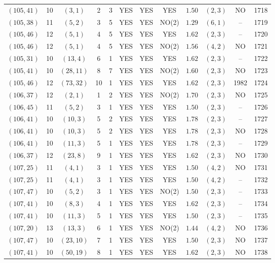 \begin{longtable}{|c|c|c|c|c|c|c|c|c|c|c|c|}
$(105,41)$ & 10 & $(3,1)$ & 2 & 3 & YES & YES & YES & $1.50$ & $(2,3)$ & NO & 1718\\
$(105,38)$ & 11 & $(5,2)$ & 3 & 5 & YES & YES & NO(2) & $1.29$ & $(6,1)$ & -- & 1719\\
$(105,46)$ & 12 & $(5,1)$ & 4 & 5 & YES & YES & YES & $1.62$ & $(2,3)$ & -- & 1720\\
$(105,46)$ & 12 & $(5,1)$ & 4 & 5 & YES & YES & NO(2) & $1.56$ & $(4,2)$ & NO & 1721\\
$(105,31)$ & 10 & $(13,4)$ & 6 & 1 & YES & YES & YES & $1.62$ & $(2,3)$ & -- & 1722\\
$(105,41)$ & 10 & $(28,11)$ & 8 & 7 & YES & YES & NO(2) & $1.60$ & $(2,3)$ & NO & 1723\\
$(105,46)$ & 12 & $(73,32)$ & 10 & 1 & YES & YES & YES & $1.62$ & $(2,3)$ & 1982 & 1724\\
$(106,37)$ & 12 & $(2,1)$ & 1 & 2 & YES & YES & NO(2) & $1.70$ & $(2,3)$ & NO & 1725\\
$(106,45)$ & 11 & $(5,2)$ & 3 & 1 & YES & YES & YES & $1.50$ & $(2,3)$ & -- & 1726\\
$(106,41)$ & 10 & $(10,3)$ & 5 & 2 & YES & YES & YES & $1.78$ & $(2,3)$ & -- & 1727\\
$(106,41)$ & 10 & $(10,3)$ & 5 & 2 & YES & YES & YES & $1.78$ & $(2,3)$ & NO & 1728\\
$(106,41)$ & 10 & $(11,3)$ & 5 & 1 & YES & YES & YES & $1.78$ & $(2,3)$ & -- & 1729\\
$(106,37)$ & 12 & $(23,8)$ & 9 & 1 & YES & YES & YES & $1.62$ & $(2,3)$ & NO & 1730\\
$(107,25)$ & 11 & $(4,1)$ & 3 & 1 & YES & YES & YES & $1.50$ & $(4,2)$ & NO & 1731\\
$(107,25)$ & 11 & $(4,1)$ & 3 & 1 & YES & YES & YES & $1.50$ & $(4,2)$ & -- & 1732\\
$(107,47)$ & 10 & $(5,2)$ & 3 & 1 & YES & YES & NO(2) & $1.50$ & $(2,3)$ & -- & 1733\\
$(107,41)$ & 10 & $(8,3)$ & 4 & 1 & YES & YES & YES & $1.62$ & $(2,3)$ & -- & 1734\\
$(107,41)$ & 10 & $(11,3)$ & 5 & 1 & YES & YES & YES & $1.50$ & $(2,3)$ & -- & 1735\\
$(107,20)$ & 13 & $(13,3)$ & 6 & 1 & YES & YES & NO(2) & $1.44$ & $(4,2)$ & NO & 1736\\
$(107,47)$ & 10 & $(23,10)$ & 7 & 1 & YES & YES & YES & $1.50$ & $(2,3)$ & NO & 1737\\
$(107,41)$ & 10 & $(50,19)$ & 8 & 1 & YES & YES & YES & $1.62$ & $(2,3)$ & NO & 1738\\

\end{longtable}

